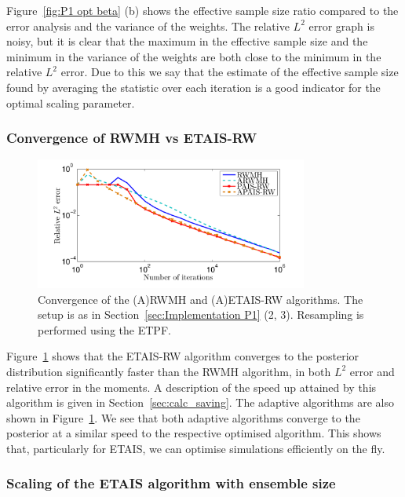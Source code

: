 \documentclass[final]{siamltex}
\begin{document}
Figure~\ref{fig:P1 opt beta} (b) shows the effective sample size ratio
compared to the error analysis and the variance of the weights. The
relative $L^2$ error graph is noisy, but it is clear that the maximum
in the effective sample size and the minimum in the variance of the
weights are both close to the minimum in the relative $L^2$ error. Due
to this we say that the estimate of the effective sample size found by
averaging the statistic over each iteration is a good indicator for
the optimal scaling parameter.


\subsubsection{Convergence of RWMH vs ETAIS-RW}

\begin{figure}[htb]
\centering
\includegraphics[width=0.8\textwidth]{"figures/new_G2_l2"}
\caption{Convergence of the (A)RWMH and (A)ETAIS-RW algorithms. The
setup is as in Section~\ref{sec:Implementation P1} (2, 3). Resampling
is performed using the ETPF.}
\label{fig:MH1 L2}
\end{figure}

Figure~\ref{fig:MH1 L2} shows that the ETAIS-RW algorithm converges
to the posterior distribution significantly faster than the RWMH
algorithm, in both $L^2$ error and relative error in the moments. A
description of the speed up attained by this algorithm is given in
Section~\ref{sec:calc_saving}. The adaptive algorithms are also shown
in Figure~\ref{fig:MH1 L2}. We see that both adaptive algorithms
converge to the posterior at a similar speed to the respective
optimised algorithm. This shows that, particularly for ETAIS, we can
optimise simulations efficiently on the fly.


\subsubsection{Scaling of the ETAIS algorithm with ensemble size}
\end{document}
